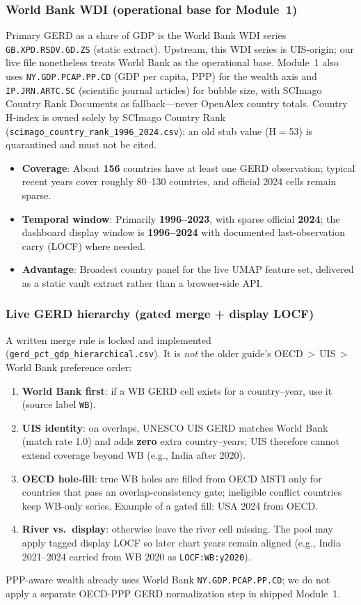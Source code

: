 \subsubsection{World Bank WDI (operational base for Module~1)}
Primary GERD as a share of GDP is the World Bank WDI series \texttt{GB.XPD.RSDV.GD.ZS} (static extract). Upstream, this WDI series is UIS-origin; our live file nonetheless treats World Bank as the operational base. Module~1 also uses \texttt{NY.GDP.PCAP.PP.CD} (GDP per capita, PPP) for the wealth axis and \texttt{IP.JRN.ARTC.SC} (scientific journal articles) for bubble size, with SCImago Country Rank Documents as fallback---never OpenAlex country totals. Country H-index is owned solely by SCImago Country Rank (\texttt{scimago\_country\_rank\_1996\_2024.csv}); an old stub value (H$=$53) is quarantined and must not be cited.
\begin{itemize}
    \item \textbf{Coverage}: About \textbf{156} countries have at least one GERD observation; typical recent years cover roughly 80--130 countries, and official 2024 cells remain sparse.
    \item \textbf{Temporal window}: Primarily \textbf{1996--2023}, with sparse official \textbf{2024}; the dashboard display window is \textbf{1996--2024} with documented last-observation carry (LOCF) where needed.
    \item \textbf{Advantage}: Broadest country panel for the live UMAP feature set, delivered as a static vault extract rather than a browser-side API.
\end{itemize}

\subsubsection{Live GERD hierarchy (gated merge + display LOCF)}
A written merge rule is locked and implemented (\texttt{gerd\_pct\_gdp\_hierarchical.csv}). It is \emph{not} the older guide's OECD\,$>$\,UIS\,$>$\,World Bank preference order:
\begin{enumerate}
    \item \textbf{World Bank first}: if a WB GERD cell exists for a country--year, use it (source label \texttt{WB}).
    \item \textbf{UIS identity}: on overlaps, UNESCO UIS GERD matches World Bank (match rate 1.0) and adds \textbf{zero} extra country--years; UIS therefore cannot extend coverage beyond WB (e.g., India after 2020).
    \item \textbf{OECD hole-fill}: true WB holes are filled from OECD MSTI only for countries that pass an overlap-consistency gate; ineligible conflict countries keep WB-only series. Example of a gated fill: USA 2024 from OECD.
    \item \textbf{River vs.\ display}: otherwise leave the river cell missing. The pool may apply tagged display LOCF so later chart years remain aligned (e.g., India 2021--2024 carried from WB 2020 as \texttt{LOCF:WB:y2020}).
\end{enumerate}
PPP-aware wealth already uses World Bank \texttt{NY.GDP.PCAP.PP.CD}; we do not apply a separate OECD-PPP GERD normalization step in shipped Module~1.

